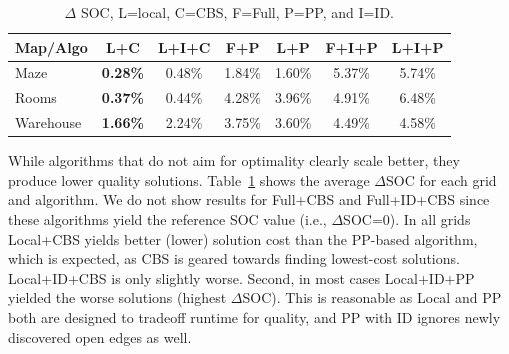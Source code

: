 \documentclass[letterpaper]{article} %
\def\
UrlFont{\rm}  %
\theoremstyle{definition}
\begin{document}
\begin{table}
\centering
\footnotesize
\begin{tabular}{@{}l|cccccc@{}}
\toprule
Map/Algo  & L+C & L+I+C & F+P & L+P & F+I+P & L+I+P \\ \midrule
Maze      & \textbf{0.28\%} & 0.48\%     & 1.84\%    & 1.60\%     & 5.37\%       & 5.74\%       \\
Rooms     & \textbf{0.37\%}  & 0.44\%    & 4.28\%    & 3.96\%     & 4.91\%       & 6.48\%        \\
Warehouse & \textbf{1.66\%}  & 2.24\%    & 3.75\%    & 3.60\%     & 4.49\%       & 4.58\%        \\ \bottomrule
\end{tabular}
    \caption{$\Delta$ SOC, L=local, C=CBS, F=Full, P=PP, and I=ID.}
    \label{tab:delta-soc}
\end{table}

While algorithms that do not aim for optimality clearly scale better, they produce lower quality solutions.
Table~\ref{tab:delta-soc} shows the average $\Delta$SOC for each grid and algorithm. We do not show results for Full+CBS and Full+ID+CBS since these algorithms yield the reference SOC value (i.e., $\Delta$SOC=0). 
In all grids Local+CBS yields better (lower) solution cost than the PP-based algorithm, which is expected, as CBS is geared towards finding lowest-cost solutions. Local+ID+CBS is only slightly worse.
Second, in most cases Local+ID+PP yielded the worse solutions (highest $\Delta$SOC). This is reasonable as Local and PP both are designed to tradeoff runtime for quality, and PP with ID ignores newly discovered open edges as well. 

\end{document}

